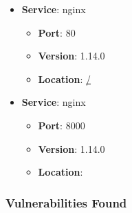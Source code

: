\documentclass{article}
\begin{document}
\begin{itemize}
    
        \item \textbf{Service}: nginx
        \begin{itemize}
            \item \textbf{Port}: 80
            \item \textbf{Version}:  1.14.0 
            \item \textbf{Location}: \href{ / }{ / }
        \end{itemize}
    
        \item \textbf{Service}: nginx
        \begin{itemize}
            \item \textbf{Port}: 8000
            \item \textbf{Version}:  1.14.0 
            \item \textbf{Location}: \href{  }{  }
        \end{itemize}
    
\end{itemize}


\subsubsection*{Vulnerabilities Found}
\end{document}
